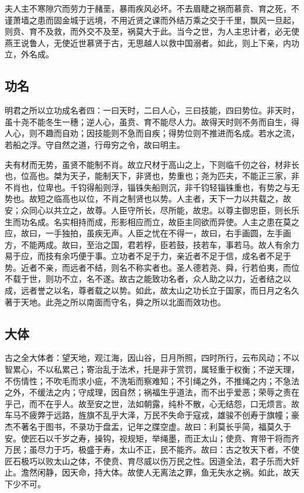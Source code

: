 \documentclass[]{article}
\begin{document}
夫人主不寒隙穴而劳力于赭垩，暴雨疾风必坏。不去眉睫之祸而慕贲、育之死，不谨萧墙之患而固金城于远境，不用近贤之课而外结万乘之交于千里，飘风一旦起，则贲、育不及救，而外交不及至，祸莫大于此。当今之世，为人主忠计者，必无使燕王说鲁人，无使近世慕贤于古，无思越人以救中国溺者。如此，则上下亲，内功立，外名成。

\hypertarget{header-n1091}{%
\subsection{功名}\label{header-n1091}}

明君之所以立功成名者四：一曰天时，二曰人心，三曰技能，四曰势位。非天时，虽十尧不能冬生一穗；逆人心，虽贲、育不能尽人力。故得天时则不务而自生，得人心，则不趣而自劝；因技能则不急而自疾；得势位则不推进而名成。若水之流，若船之浮。守自然之道，行毋穷之令，故曰明主。

夫有材而无势，虽贤不能制不肖。故立尺材于高山之上，下则临千仞之谷，材非长也，位高也。桀为天子，能制天下，非贤也，势重也；尧为匹夫，不能正三家，非不肖也，位卑也。千钧得船则浮，锱铢失船则沉，非千钧轻锱铢重也，有势之与无势也。故短之临高也以位，不肖之制贤也以势。人主者，天下一力以共载之，故安；众同心以共立之，故尊。人臣守所长，尽所能，故忠。以尊主御忠臣，则长乐生而功名成。名实相持而成，形影相应而立，故臣主同欲而异使。人主之患在莫之应，故曰，一手独拍，虽疾无声。人臣之忧在不得一，故曰，右手画圆，左手画方，不能两成。故曰，至治之国，君若桴，臣若鼓，技若车，事若马。故人有余力易于应，而技有余巧便于事。立功者不足于力，亲近者不足于信，成名者不足于势。近者不亲，而远者不结，则名不称实者也。圣人德若尧、舜，行若伯夷，而位不载于世，则功不立，名不遂。故古之能致功名者，众人助之以力，近者结之以成，远者誉之以名，尊者载之以势。如此，故太山之功长立于国家，而日月之名久著于天地。此尧之所以南面而守名，舜之所以北面而效功也。

\hypertarget{header-n1094}{%
\subsection{大体}\label{header-n1094}}

古之全大体者：望天地，观江海，因山谷，日月所照，四时所行，云布风动；不以智累心，不以私累己；寄治乱于法术，托是非于赏罚，属轻重于权衡；不逆天理，不伤情性；不吹毛而求小疵，不洗垢而察难知；不引绳之外，不推绳之内；不急法之外，不缓法之内；守成理，因自然；祸福生乎道法，而不出乎爱恶；荣辱之责在乎己，而不在乎人。故至安之世，法如朝露，纯朴不散，心无结怨，口无烦言。故车马不疲弊于远路，旌旗不乱乎大泽，万民不失命于寇戎，雄骏不创寿于旗幢；豪杰不著名于图书，不录功于盘盂，记年之牒空虚。故曰：利莫长乎简，福莫久于安。使匠石以千岁之寿，操钩，视规矩，举绳墨，而正太山；使贲、育带干将而齐万民；虽尽力于巧，极盛于寿，太山不正，民不能齐。故曰：古之牧天下者，不使匠石极巧以败太山之体，不使贲、育尽威以伤万民之性。因道全法，君子乐而大奸止。澹然闲静，因天命，持大体。故使人无离法之罪，鱼无失水之祸。如此，故天下少不可。
\end{document}
